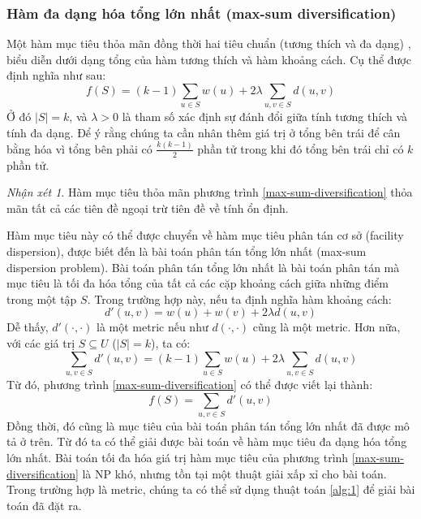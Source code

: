 \documentclass[12pt]{report}
\begin{document}
\subsubsection{Hàm đa dạng hóa tổng lớn nhất (max-sum diversification)}
Một hàm mục tiêu thỏa mãn đồng thời hai tiêu chuẩn (tương thích và đa dạng)
, biểu diễn dưới dạng tổng của hàm tương thích và hàm khoảng cách. Cụ thể 
được định nghĩa như sau: 
\begin{equation}
\label{max-sum-diversification}
f(S) = (k - 1) \sum_{u \in S} w(u) + 2 \lambda \sum_{u, v \in S} d(u, v)
\end{equation}
Ở đó $|S| = k$, và $\lambda > 0$ là tham số xác định sự đánh đổi giữa tính 
tương thích và tính đa dạng. Để ý rằng chúng ta cần nhân thêm giá trị 
ở tổng bên trái để cân bằng hóa vì tổng bên phải có
$\frac{k(k - 1)}{2}$ phần tử trong khi đó tổng bên 
trái chỉ có $k$ phần tử.

\textit{Nhận xét 1}. Hàm mục tiêu thỏa mãn phương trình 
\ref{max-sum-diversification} thỏa mãn tất cả các tiên đề ngoại trừ tiên đề
về tính ổn định. 

Hàm mục tiêu này có thể được chuyển về hàm mục tiêu phân tán cơ sở 
(facility dispersion), được biết đến là bài toán phân tán tổng lớn nhất
(max-sum dispersion problem). 
Bài toán phân tán tổng lớn nhất là bài toán phân tán mà mục tiêu 
là tối đa hóa tổng của 
tất cả các cặp khoảng cách giữa những điểm trong một tập $S$.
Trong trường hợp này, nếu ta định nghĩa hàm khoảng cách: 
\begin{equation}
\label{new-distance-msd}
    d'(u, v) = w(u) + w(v) + 2\lambda d(u, v)
\end{equation}
Dễ thấy, $d'(\cdot, \cdot)$ là một metric nếu như $d(\cdot, \cdot)$ 
cũng là một metric. Hơn nữa, với các giá trị 
$S \subseteq U$  ($|S| = k$), ta có: 
$$
    \sum_{u, v \in S} d'(u, v) = 
    (k - 1) \sum_{u \in S} w(u) +
    2 \lambda \sum_{u, v \in S} d(u, v)
$$
Từ đó, phương trình \ref{max-sum-diversification} có thể được viết lại 
thành: 
$$
f(S) = \sum_{u, v \in S} d'(u, v)
$$
Đồng thời, đó cũng là mục tiêu của bài toán phân tán tổng lớn nhất 
đã được mô tả ở trên. Từ đó ta có thể giải được bài toán 
về hàm mục tiêu
đa dạng hóa tổng lớn nhất. Bài toán tối đa hóa giá trị hàm mục tiêu của 
phương trình \ref{max-sum-diversification} là NP khó, nhưng tồn tại một 
thuật giải xấp xỉ cho bài toán. 
Trong trường hợp là metric, chúng ta có thể sử dụng 
thuật toán \ref{alg:1} để giải bài 
toán đã đặt ra. 
\end{document}
